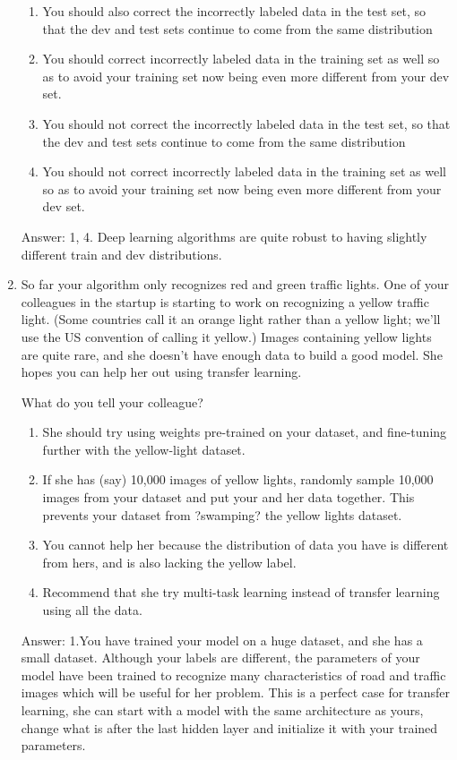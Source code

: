 \documentclass[12pt]{article}
\numberwithin{equation}{section}
\begin{document}
\begin{enumerate}
	\begin{enumerate}
		\item You should also correct the incorrectly labeled data in the test set, so that the dev and test sets continue to come from the same distribution
		\item You should correct incorrectly labeled data in the training set as well so as to avoid your training set now being even more different from your dev set.
		\item You should not correct the incorrectly labeled data in the test set, so that the dev and test sets continue to come from the same distribution
		\item You should not correct incorrectly labeled data in the training set as well so as to avoid your training set now being even more different from your dev set.
	\end{enumerate}
	Answer: 1, 4. Deep learning algorithms are quite robust to having slightly different train and dev distributions.
	\item So far your algorithm only recognizes red and green traffic lights. One of your colleagues in the startup is starting to work on recognizing a yellow traffic light. (Some countries call it an orange light rather than a yellow light; we'll use the US convention of calling it yellow.) Images containing yellow lights are quite rare, and she doesn't have enough data to build a good model. She hopes you can help her out using transfer learning. \par
	What do you tell your colleague?
	\begin{enumerate}
		\item She should try using weights pre-trained on your dataset, and fine-tuning further with the yellow-light dataset.
		\item If she has (say) 10,000 images of yellow lights, randomly sample 10,000 images from your dataset and put your and her data together. This prevents your dataset from ?swamping? the yellow lights dataset.
		\item You cannot help her because the distribution of data you have is different from hers, and is also lacking the yellow label.
		\item Recommend that she try multi-task learning instead of transfer learning using all the data.
	\end{enumerate}
	Answer: 1.You have trained your model on a huge dataset, and she has a small dataset. Although your labels are different, the parameters of your model have been trained to recognize many characteristics of road and traffic images which will be useful for her problem. This is a perfect case for transfer learning, she can start with a model with the same architecture as yours, change what is after the last hidden layer and initialize it with your trained parameters.

\end{enumerate}
\end{document}
